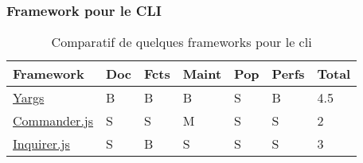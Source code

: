 \subsubsection*{Framework pour le CLI}

\begin{table}[h]
    \centering
    \begin{tabular}{| l | l | l | l | l | l | l |}
    \hline
        Framework & Doc & Fcts & Maint & Pop & Perfs & Total \\
    \hline
        \href{http://yargs.js.org/}{Yargs} &
        B &  
        B &
        B &            
        S &              
        B &   
        4.5 \\
    \hline
        \href{https://github.com/tj/commander.js}{Commander.js} &
        S &                
        S &   
        M &
        S &              
        S &  
        2 \\
    \hline
        \href{https://github.com/SBoudrias/Inquirer.js}{Inquirer.js} &
        S &                
        B &     
        S &
        S &              
        S &      
        3 \\  
    \hline
    \end{tabular}
    \caption{Comparatif de quelques frameworks pour le \Gls{cli}}
\end{table}
\thinspace %